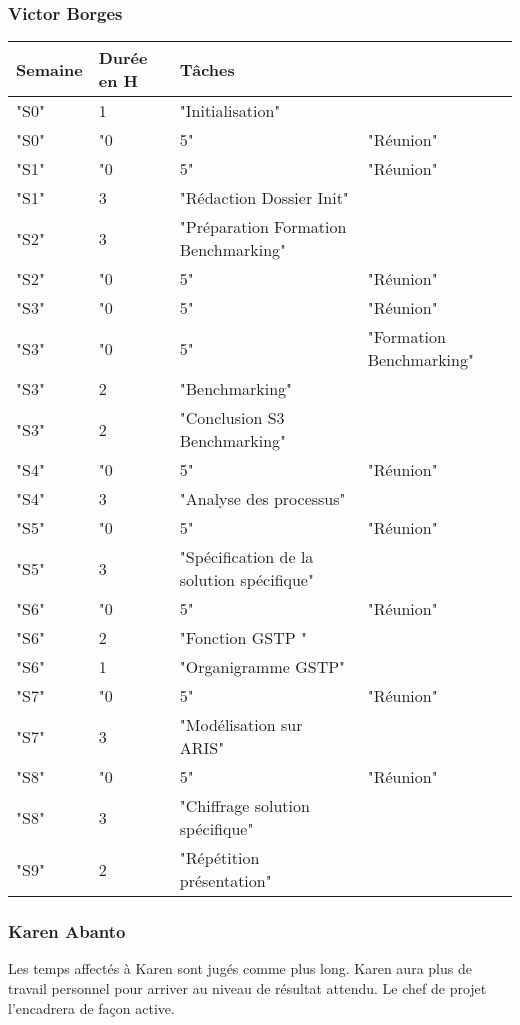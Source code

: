 \vfill
\pagebreak

\subsubsection{Victor Borges}
\begin{tabular}{|l|l|l|l|}
\hline
Semaine&Durée en H&Tâches\\
\hline
"S0"&1&"Initialisation"&\\
\hline
"S0"&"0&5"&"Réunion"\\
\hline
"S1"&"0&5"&"Réunion"\\
\hline
"S1"&3&"Rédaction Dossier Init"&\\
\hline
"S2"&3&"Préparation Formation Benchmarking"&\\
\hline
"S2"&"0&5"&"Réunion"\\
\hline
"S3"&"0&5"&"Réunion"\\
\hline
"S3"&"0&5"&"Formation Benchmarking"\\
\hline
"S3"&2&"Benchmarking"&\\
\hline
"S3"&2&"Conclusion S3 Benchmarking"&\\
\hline
"S4"&"0&5"&"Réunion"\\
\hline
"S4"&3&"Analyse des processus"&\\
\hline
"S5"&"0&5"&"Réunion"\\
\hline
"S5"&3&"Spécification de la solution spécifique"&\\
\hline
"S6"&"0&5"&"Réunion"\\
\hline
"S6"&2&"Fonction GSTP "&\\
\hline
"S6"&1&"Organigramme GSTP"&\\
\hline
"S7"&"0&5"&"Réunion"\\
\hline
"S7"&3&"Modélisation sur ARIS"&\\
\hline
"S8"&"0&5"&"Réunion"\\
\hline
"S8"&3&"Chiffrage solution spécifique"&\\
\hline
"S9"&2&"Répétition présentation"&\\
\hline
\end{tabular}
\vfill

\pagebreak
\subsubsection{Karen Abanto}

Les temps affectés à Karen sont jugés comme plus long. Karen aura plus de travail
personnel pour arriver au niveau de résultat attendu. 
Le chef de projet l'encadrera de façon active.

